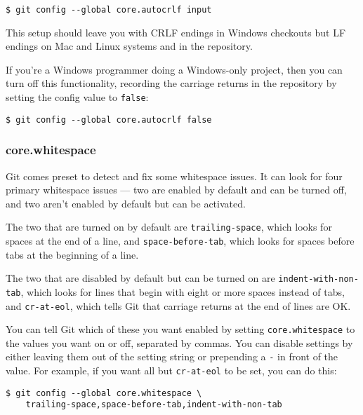 \documentclass[a4paper]{book}
\newcounter{tab}[chapter]
\begin{document}
\begin{shaded}\begin{verbatim}
$ git config --global core.autocrlf input
\end{verbatim}\end{shaded}

This setup should leave you with CRLF endings in Windows checkouts but LF endings on Mac and Linux systems and in the repository.

If you're a Windows programmer doing a Windows-only project, then you can turn off this functionality, recording the carriage returns in the repository by setting the config value to \texttt{false}:

\begin{shaded}\begin{verbatim}
$ git config --global core.autocrlf false
\end{verbatim}\end{shaded}

\subsubsection{core.whitespace}

Git comes preset to detect and fix some whitespace issues. It can look for four primary whitespace issues --- two are enabled by default and can be turned off, and two aren't enabled by default but can be activated.

The two that are turned on by default are \texttt{trailing-space}, which looks for spaces at the end of a line, and \texttt{space-before-tab}, which looks for spaces before tabs at the beginning of a line.

The two that are disabled by default but can be turned on are \texttt{indent-with-non-tab}, which looks for lines that begin with eight or more spaces instead of tabs, and \texttt{cr-at-eol}, which tells Git that carriage returns at the end of lines are OK.

You can tell Git which of these you want enabled by setting \texttt{core.whitespace} to the values you want on or off, separated by commas. You can disable settings by either leaving them out of the setting string or prepending a \texttt{-} in front of the value. For example, if you want all but \texttt{cr-at-eol} to be set, you can do this:

\begin{shaded}\begin{verbatim}
$ git config --global core.whitespace \
    trailing-space,space-before-tab,indent-with-non-tab
\end{verbatim}\end{shaded}
\end{document}
